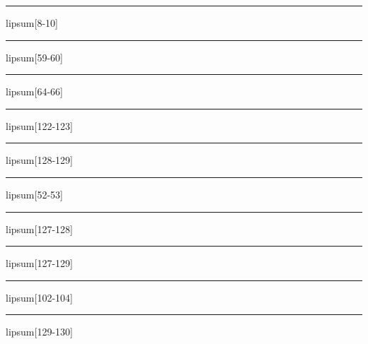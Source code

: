 \documentclass[11pt,a4paper]{article}
\begin{document}
\begin{simplewrap}
  \textcolor{magenta!58}{\rule{4.0cm}{8.2cm}}
\end{simplewrap}
lipsum[8-10]

\begin{simplewrap}
  \textcolor{teal!14}{\rule{4.1cm}{8.3cm}}
\end{simplewrap}
lipsum[59-60]

\begin{simplewrap}
  \textcolor{olive!32}{\rule{4.5cm}{2.1cm}}
\end{simplewrap}
lipsum[64-66]

\begin{simplewrap}
  \textcolor{pink!53}{\rule{5.2cm}{4.7cm}}
\end{simplewrap}
lipsum[122-123]

\begin{simplewrap}
  \textcolor{yellow!46}{\rule{3.8cm}{9.6cm}}
\end{simplewrap}
lipsum[128-129]

\begin{simplewrap}
  \textcolor{magenta!57}{\rule{3.7cm}{4.1cm}}
\end{simplewrap}
lipsum[52-53]

\begin{simplewrap}
  \textcolor{lime!19}{\rule{5.3cm}{3.0cm}}
\end{simplewrap}
lipsum[127-128]

\begin{simplewrap}
  \textcolor{magenta!12}{\rule{5.5cm}{5.0cm}}
\end{simplewrap}
lipsum[127-129]

\begin{simplewrap}
  \textcolor{teal!41}{\rule{3.5cm}{8.1cm}}
\end{simplewrap}
lipsum[102-104]

\begin{simplewrap}
  \textcolor{purple!13}{\rule{4.6cm}{5.4cm}}
\end{simplewrap}
lipsum[129-130]
\end{document}
